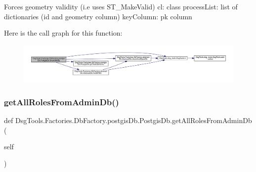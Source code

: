 \begin{DoxyVerb}Forces geometry validity (i.e uses ST_MakeValid)
cl: class
processList: list of dictionaries (id and geometry column)
keyColumn: pk column
\end{DoxyVerb}
 Here is the call graph for this function\+:
\nopagebreak
\begin{figure}[H]
\begin{center}
\leavevmode
\includegraphics[width=350pt]{class_dsg_tools_1_1_factories_1_1_db_factory_1_1postgis_db_1_1_postgis_db_a0f61c48440ee4fa26614b6adf7d55429_cgraph}
\end{center}
\end{figure}
\mbox{\label{class_dsg_tools_1_1_factories_1_1_db_factory_1_1postgis_db_1_1_postgis_db_a780e78e0c9234120ff4662bf5892c5a4}} 
\subsubsection{\texorpdfstring{get\+All\+Roles\+From\+Admin\+Db()}{getAllRolesFromAdminDb()}}
{\footnotesize\ttfamily def Dsg\+Tools.\+Factories.\+Db\+Factory.\+postgis\+Db.\+Postgis\+Db.\+get\+All\+Roles\+From\+Admin\+Db (\begin{DoxyParamCaption}\item[{}]{self }\end{DoxyParamCaption})}

